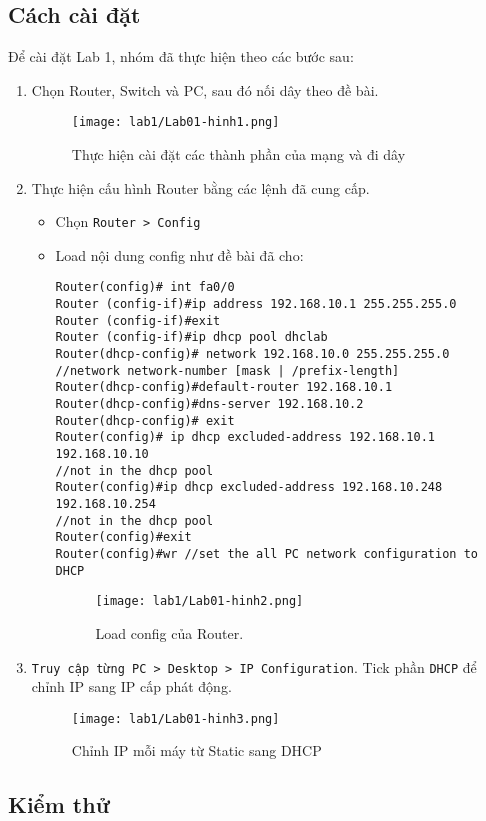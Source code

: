 \documentclass[]{article}
\begin{document}
\subsection{Cách cài đặt}
Để cài đặt Lab 1, nhóm đã thực hiện theo các bước sau:
\begin{enumerate}
\item Chọn Router, Switch và PC, sau đó nối dây theo đề bài.
\begin{figure}[H]
    \centering
    \texttt{[image: lab1/Lab01-hinh1.png]}
    \caption{Thực hiện cài đặt các thành phần của mạng và đi dây}
\end{figure}
\item Thực hiện cấu hình Router bằng các lệnh đã cung cấp.
\begin{itemize}
\item Chọn \texttt{Router > Config}
\item Load nội dung config như đề bài đã cho:
\begin{lstlisting}
Router(config)# int fa0/0
Router (config-if)#ip address 192.168.10.1 255.255.255.0
Router (config-if)#exit
Router (config-if)#ip dhcp pool dhclab
Router(dhcp-config)# network 192.168.10.0 255.255.255.0
//network network-number [mask | /prefix-length]
Router(dhcp-config)#default-router 192.168.10.1
Router(dhcp-config)#dns-server 192.168.10.2
Router(dhcp-config)# exit
Router(config)# ip dhcp excluded-address 192.168.10.1 192.168.10.10
//not in the dhcp pool
Router(config)#ip dhcp excluded-address 192.168.10.248 192.168.10.254
//not in the dhcp pool
Router(config)#exit
Router(config)#wr //set the all PC network configuration to DHCP
\end{lstlisting}
\begin{figure}[H]
    \centering
    \texttt{[image: lab1/Lab01-hinh2.png]}
    \caption{Load config của Router.}
\end{figure}
\end{itemize}
\item \texttt{Truy cập từng PC > Desktop > IP Configuration}. Tick phần \texttt{DHCP} để chỉnh IP sang IP cấp phát động.\label{checkDHCP}
\begin{figure}[H]
    \centering
    \texttt{[image: lab1/Lab01-hinh3.png]}
    \caption{Chỉnh IP mỗi máy từ Static sang DHCP}
\end{figure}
\end{enumerate}

\subsection{Kiểm thử}
\end{document}
